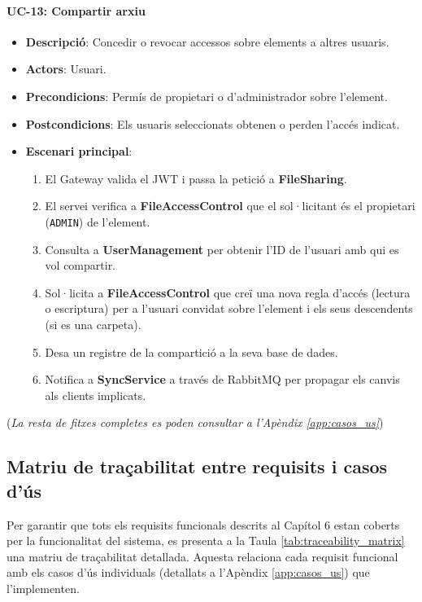 \paragraph{UC-13: Compartir arxiu}
\begin{itemize}
  \item \textbf{Descripció}: Concedir o revocar accessos sobre elements a altres usuaris.
  \item \textbf{Actors}: Usuari.
  \item \textbf{Precondicions}: Permís de propietari o d'administrador sobre l'element.
  \item \textbf{Postcondicions}: Els usuaris seleccionats obtenen o perden l'accés indicat.
  \item \textbf{Escenari principal}:
    \begin{enumerate}
        \item El Gateway valida el JWT i passa la petició a \textbf{FileSharing}.
        \item El servei verifica a \textbf{FileAccessControl} que el sol·licitant és el propietari (\texttt{ADMIN}) de l'element.
        \item Consulta a \textbf{UserManagement} per obtenir l'ID de l'usuari amb qui es vol compartir.
        \item Sol·licita a \textbf{FileAccessControl} que creï una nova regla d'accés (lectura o escriptura) per a l'usuari convidat sobre l'element i els seus descendents (si es una carpeta).
        \item Desa un registre de la compartició a la seva base de dades.
        \item Notifica a \textbf{SyncService} a través de RabbitMQ per propagar els canvis als clients implicats.
    \end{enumerate}
\end{itemize}

(\emph{La resta de fitxes completes es poden consultar a l'Apèndix \ref{app:casos_us}})

\subsection{Matriu de traçabilitat entre requisits i casos d'ús}
Per garantir que tots els requisits funcionals descrits al Capítol 6 estan coberts per la funcionalitat del sistema, es presenta a la Taula \ref{tab:traceability_matrix} una matriu de traçabilitat detallada. Aquesta relaciona cada requisit funcional amb els casos d'ús individuals (detallats a l'Apèndix \ref{app:casos_us}) que l'implementen.

